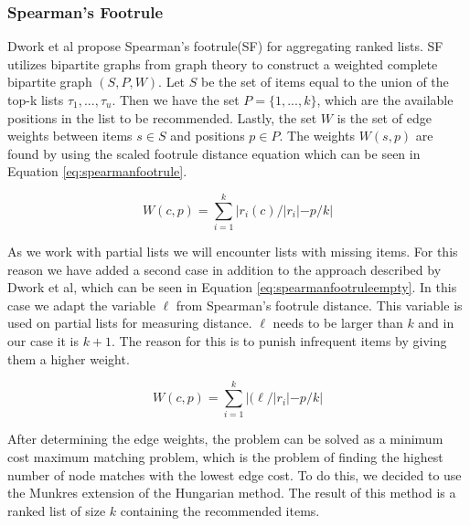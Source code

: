 \subsubsection{Spearman's Footrule}\label{sec:spearmansfootrule}
Dwork et al propose Spearman's footrule(SF) for aggregating ranked lists\citep{rank:aggregation}.
SF utilizes bipartite graphs from graph theory to construct a weighted complete bipartite graph $(S,P,W)$.
Let $S$ be the set of items equal to the union of the top-k lists $\tau_1, ..., \tau_u$. Then we have the set $P = \{1,...,k\}$, which are the available positions in the list to be recommended. Lastly, the set $W$ is the set of edge weights between items $s\in S$ and positions $p\in P$. The weights $W(s,p)$ are found by using the scaled footrule distance equation which can be seen in Equation \ref{eq:spearmanfootrule}\cite{rank:aggregation}.
 
\begin{equation}\label{eq:spearmanfootrule}
W(c,p) = \displaystyle\sum_{i=1}^{k} |r_i(c)/|r_i| - p/k|
\end{equation}

As we work with partial lists we will encounter lists with missing items. For this reason we have added a second case in addition to the approach described by Dwork et al, which can be seen in Equation \ref{eq:spearmanfootruleempty}. In this case we adapt the variable $\ell$ from Spearman's footrule distance. This variable is used on partial lists for measuring distance. $\ell$ needs to be larger than $k$ and in our case it is $k + 1$. The reason for this is to punish infrequent items by giving them a higher weight.

\begin{equation}\label{eq:spearmanfootruleempty}
W(c,p) = \displaystyle\sum_{i=1}^{k} |(\ell/|r_i| - p/k|
\end{equation}

After determining the edge weights, the problem can be solved as a minimum cost maximum matching problem, which is the problem of finding the highest number of node matches with the lowest edge cost. To do this, we decided to use the Munkres extension of the Hungarian method\cite{Munkres1957}. The result of this method is a ranked list of size $k$ containing the recommended items.